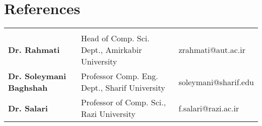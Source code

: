 

\section{References}\vspace{-1.0em}

\begin{tabularx}{\textwidth} { 
		>{\raggedright\arraybackslash}l
		>{\centering}X
		>{\raggedleft\arraybackslash}l }
	\multicolumn{3}{c}{} \\	%
	\textbf{Dr. Rahmati} & 
	Head of Comp. Sci. Dept., Amirkabir University   & 
	zrahmati@aut.ac.ir \\ 
	
	\textbf{Dr. Soleymani Baghshah} & 
	Professor Comp. Eng. Dept., Sharif University   & 
	soleymani@sharif.edu \\ 

		\textbf{Dr. Salari} &
	Professor of Comp. Sci., Razi University & 
	f.salari@razi.ac.ir
 
	
	
\end{tabularx}